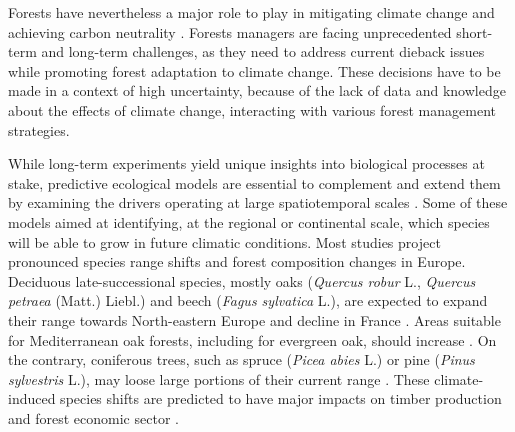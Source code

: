 \documentclass[letterpaper,8pt]{article}  %
\begin{document}
\begin{doublespacing}
\begin{linenumbers}
Forests have nevertheless a major role to play in mitigating climate change and achieving carbon neutrality \citep{Korosuo2023, Hyyrynen2023}. Forests managers are facing unprecedented short-term and long-term challenges, as they need to address current dieback issues while promoting forest adaptation to climate change. These decisions have to be made in a context of high uncertainty, because of the lack of data and knowledge about the effects of climate change, interacting with various forest management strategies.

While long-term experiments yield unique insights into biological processes at stake, predictive ecological models are essential to complement and extend them by examining the drivers operating at large spatiotemporal scales \citep{Levins1993, Mitchell2006}. Some of these models aimed at identifying, at the regional or continental scale, which species will be able to grow in future climatic conditions. Most studies project pronounced species range shifts and forest composition changes in Europe. Deciduous late-successional species, mostly oaks (\emph{Quercus robur} L., \emph{Quercus petraea} (Matt.) Liebl.) and beech (\emph{Fagus sylvatica} L.), are expected to expand their range towards North-eastern Europe and decline in France \citep{Hickler2012, Hanewinkel2013, Saltre2015, Schueler2014, Dyderski2018, Takolander2019, Wessely2024}. Areas suitable for Mediterranean oak forests, including for evergreen oak, should increase \citep{Ohlemueller2006, Hanewinkel2013, Takolander2019}. On the contrary, coniferous trees, such as spruce (\emph{Picea abies} L.) or pine (\emph{Pinus sylvestris} L.), may loose large portions of their current range \citep{Hanewinkel2013, Schueler2014, Wessely2024}. These climate-induced species shifts are predicted to have major impacts on timber production and forest economic sector \citep{Hanewinkel2013, Wessely2024}. 


\end{linenumbers}
\end{doublespacing}
\end{document}
